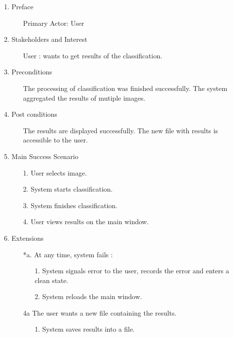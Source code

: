 \documentclass[parskip=full]{scrartcl}
\begin{document}
\begin{enumerate}
	\item Preface
	\begin{itemize} [nosep]
		\item[] Primary Actor: User
	\end{itemize}
	\item Stakeholders and Interest
	\begin{itemize} [nosep]
		\item[] User : wants to get results of the classification.
	\end{itemize}
	\item Preconditions
	\begin{itemize} [nosep]
		\item[] The processing of classification was finished successfully. The system aggregated the results of mutiple images.
	\end{itemize}
	\item Post conditions
	\begin{itemize} [nosep]
		\item[] The results are displayed successfully. The new file with results is accessible to the user.
	\end{itemize}
	\item Main Success Scenario
	\begin{itemize} [nosep]
		\item[1.] User selects image.
		\item[2.] System starts classification.
		\item[3.] System finishes classification.
		\item[4.] User views results on the main window. 
	\end{itemize}
	\item Extensions
	\begin{itemize} [nosep]
		\item[*a.] At any time, system fails :
		\begin{itemize} [nosep]
			\item[1.] System signals error to the user, records the error and enters a clean state.
			\item[2.] System reloads the main window.
		\end{itemize}
		\item[4a] The user wants a new file containing the results.
		\begin{itemize} [nosep]
			\item[1.] System saves results into a file.
		\end{itemize}
	\end{itemize}
\end{enumerate}
\end{document}
